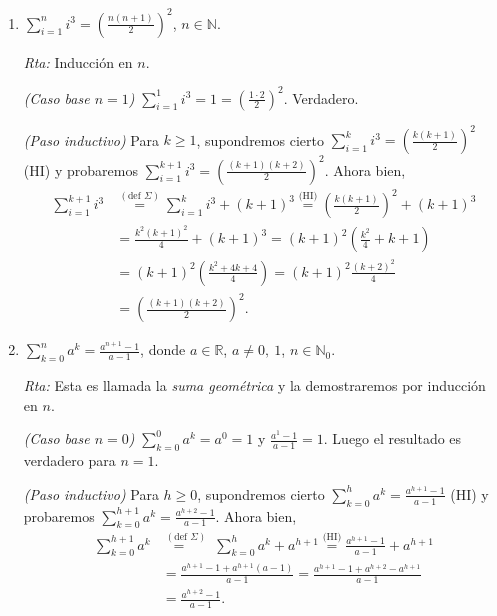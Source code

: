 \documentclass[a4paper,12pt,twoside,spanish,reqno]{amsbook}
\numberwithin{equation}{section}
\newcommand{\rta}{\noindent\textit{Rta: }}
\begin{document}
\begin{enumerate}
\begin{enumerate}
            \item  $\displaystyle{ \sum_{i=1}^n i^3 = \left( \frac{n(n+1)}{2 }\right)^2}$, $n\in \mathbb N$.
            
            \rta Inducción en $n$.
            
            \textit{(Caso base $n=1$) } $\sum_{i=1}^1 i^3 = 1 = (\frac{1 \cdot 2}{2})^2$. Verdadero. 
            
            \textit{(Paso inductivo) } Para  $k \ge 1$,  supondremos cierto $\sum_{i=1}^k i^3 = \left( \frac{k(k+1)}{2 }\right)^2$ (HI) y probaremos $\sum_{i=1}^{k+1} i^3 = \left( \frac{(k+1)(k+2)}{2 }\right)^2$. Ahora bien,
            \begin{align*}
                \sum_{i=1}^{k+1} i^3 &\overset{(\text{def } \Sigma)}{=} \sum_{i=1}^k i^3 + (k+1)^3 \overset{\text{(HI)}}{=}  \left( \frac{k(k+1)}{2 }\right)^2 + (k+1)^3 \\
                &= \frac{k^2(k+1)^2}{4 } + (k+1)^3 = (k+1)^2 \left(\frac{k^2}{4 } + k+1 \right)\\
                &= (k+1)^2 \left(\frac{k^2+4k +4}{4 } \right) = (k+1)^2\frac{(k+2)^2}{4 } \\
                &= \left( \frac{(k+1)(k+2)}{2 }\right)^2.
            \end{align*}
            
            \item\label{ej-serie-geometrica}  $\displaystyle{ \sum_{k=0}^n a^k = \frac{a^{n+1}-1}{a-1}}$, donde $a\in {\mathbb R}$, $a \neq 0,\ 1$, $n\in \mathbb N_0$.
            
            \rta Esta es llamada la \textit{suma geométrica} y la demostraremos por inducción en $n$.
            
            \textit{(Caso base $n=0$) } $\sum_{k=0}^0 a^k = a^0 = 1$ y $\frac{a^{1}-1}{a-1}=1$. Luego el resultado es verdadero para  $n=1$. 
            
            \textit{(Paso inductivo) }  Para  $h \ge 0$,  supondremos cierto $\sum_{k=0}^h a^k = \frac{a^{h+1}-1}{a-1}$ (HI) y probaremos $\sum_{k=0}^{h+1} a^k = \frac{a^{h+2}-1}{a-1}$. Ahora bien, 
            \begin{align*}
                \sum_{k=0}^{h+1} a^k &\overset{(\text{def } \Sigma)}{=\quad} \;\sum_{k=0}^h a^k + a^{h+1} \overset{\text{(HI)}}{=} \frac{a^{h+1}-1}{a-1} +  a^{h+1} \\
                &= \frac{a^{h+1}-1 + a^{h+1}(a-1)}{a-1} = \frac{a^{h+1}-1 + a^{h+2}-a^{h+1}}{a-1} \\
                &=\frac{a^{h+2}-1}{a-1}.
            \end{align*}
            

\end{enumerate}
\end{enumerate}
\end{document}
